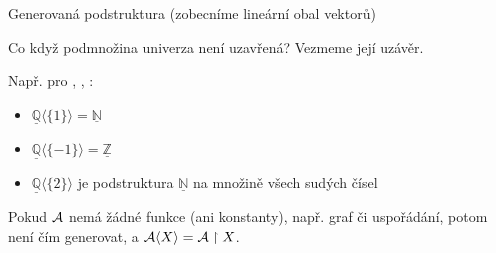 \documentclass{beamer}
\begin{document}
\begin{frame}{Generovaná podstruktura (zobecníme lineární obal vektorů)}
    
    Co když podmnožina univerza \alert{není} uzavřená? Vezmeme její \alert{uzávěr}. %

    \medskip


    \medskip

    Např. pro , , : 
    \begin{itemize}
        \item $\underline{\mathbb Q}\langle\{1\}\rangle=\underline{\mathbb N}$
        \item $\underline{\mathbb Q}\langle\{-1\}\rangle=\underline{\mathbb Z}$
        \item $\underline{\mathbb Q}\langle\{2\}\rangle$ je podstruktura $\underline{\mathbb N}$ na množině všech sudých čísel
    \end{itemize}

    \medskip
    
    Pokud $\mathcal{A}$ nemá žádné funkce (ani konstanty), např. graf či uspořádání, potom není čím generovat, a $\mathcal{A}\langle X\rangle=\mathcal{A}\restriction X$.
    
\end{frame}
\end{document}
